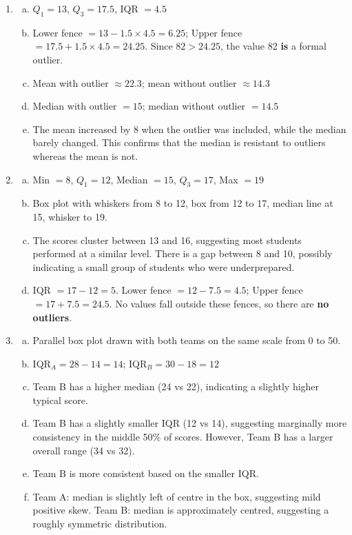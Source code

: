 \documentclass{article}
\begin{document}
\begin{enumerate}
  \item
  \begin{enumerate}[(a)]
    \item $Q_1 = 13$, $Q_3 = 17.5$, IQR $= 4.5$
    \item Lower fence $= 13 - 1.5 \times 4.5 = 6.25$; Upper fence $= 17.5 + 1.5 \times 4.5 =
    24.25$. Since $82 > 24.25$, the value 82 \textbf{is} a formal outlier.
    \item Mean with outlier $\approx 22.3$; mean without outlier $\approx 14.3$
    \item Median with outlier $= 15$; median without outlier $= 14.5$
    \item The mean increased by 8 when the outlier was included, while the median barely changed.
    This confirms that the median is resistant to outliers whereas the mean is not.
  \end{enumerate}

  \item
  \begin{enumerate}[(a)]
    \item Min $= 8$, $Q_1 = 12$, Median $= 15$, $Q_3 = 17$, Max $= 19$
    \item Box plot with whiskers from 8 to 12, box from 12 to 17, median line at 15, whisker
    to 19.
    \item The scores cluster between 13 and 16, suggesting most students performed at a similar
    level. There is a gap between 8 and 10, possibly indicating a small group of students who
    were underprepared.
    \item IQR $= 17 - 12 = 5$. Lower fence $= 12 - 7.5 = 4.5$; Upper fence $= 17 + 7.5 = 24.5$.
    No values fall outside these fences, so there are \textbf{no outliers}.
  \end{enumerate}

  \item
  \begin{enumerate}[(a)]
    \item Parallel box plot drawn with both teams on the same scale from 0 to 50.
    \item IQR$_A = 28 - 14 = 14$; IQR$_B = 30 - 18 = 12$
    \item Team B has a higher median (24 vs 22), indicating a slightly higher typical score.
    \item Team B has a slightly smaller IQR (12 vs 14), suggesting marginally more consistency
    in the middle 50\% of scores. However, Team B has a larger overall range (34 vs 32).
    \item Team B is more consistent based on the smaller IQR.
    \item Team A: median is slightly left of centre in the box, suggesting mild positive skew.
    Team B: median is approximately centred, suggesting a roughly symmetric distribution.
  \end{enumerate}


\end{enumerate}
\end{document}
